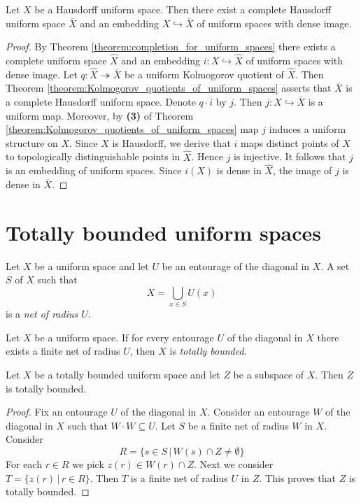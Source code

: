 \documentclass[10pt]{amsart}
\begin{document}
\begin{corollary}\label{corollary:completion_for_Hausdorff_spaces}
	Let $X$ be a Hausdorff uniform space. Then there exist a complete Hausdorff uniform space $\overline{X}$ and an embedding $X\hookrightarrow \overline{X}$ of uniform spaces with dense image.
\end{corollary}
\begin{proof}
	By Theorem \ref{theorem:completion_for_uniform_spaces} there exists a complete uniform space $\hat{X}$ and an embedding $i:X\hookrightarrow \hat{X}$ of uniform spaces with dense image. Let $q:\hat{X}\twoheadrightarrow \overline{X}$ be a uniform Kolmogorov quotient of $\hat{X}$. Then Theorem \ref{theorem:Kolmogorov_quotients_of_uniform_spaces} asserts that $\overline{X}$ is a complete Hausdorff uniform space. Denote $q\cdot i$ by $j$. Then $j:X\hookrightarrow \overline{X}$ is a uniform map. Moreover, by \textbf{(3)} of Theorem \ref{theorem:Kolmogorov_quotients_of_uniform_spaces} map $j$ induces a uniform structure on $X$. Since $X$ is Hausdorff, we derive that $i$ maps distinct points of $X$ to topologically distinguishable points in $\hat{X}$. Hence $j$ is injective. It follows that $j$ is an embedding of uniform spaces. Since $i(X)$ is dense in $\hat{X}$, the image of $j$ is dense in $\overline{X}$.
\end{proof}


\section{Totally bounded uniform spaces}

\begin{definition}
	Let $X$ be a uniform space and let $U$ be an entourage of the diagonal in $X$. A set $S$ of $X$ such that
	$$X = \bigcup_{x\in S}U(x)$$
	is a \textit{net of radius $U$}.
\end{definition}

\begin{definition}
	Let $X$ be a uniform space. If for every entourage $U$ of the diagonal in $X$ there exists a finite net of radius $U$, then $X$ is \textit{totally bounded}.
\end{definition}

\begin{theorem}\label{theorem:totally_bounded_is_inherited_by_subspaces}
	Let $X$ be a totally bounded uniform space and let $Z$ be a subspace of $X$. Then $Z$ is totally bounded.
\end{theorem}
\begin{proof}
	Fix an entourage $U$ of the diagonal in $X$. Consider an entourage $W$ of the diagonal in $X$ such that $W\cdot W \subseteq U$. Let $S$ be a finite net of radius $W$ in $X$. Consider
	$$R = \big\{s \in S\,\big|\,W(s)\cap Z \neq \emptyset\big\}$$
	For each $r\in R$ we pick $z(r) \in W(r)\cap Z$. Next we consider $T = \{z(r)\,|\,r\in R\}$. Then $T$ is a finite net of radius $U$ in $Z$. This proves that $Z$ is totally bounded.
\end{proof}
\end{document}
